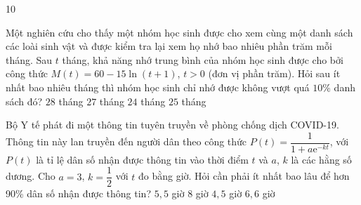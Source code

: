 \begin{indapan}{10}
\begin{ex}
	Một nghiên cứu cho thấy một nhóm học sinh được cho xem cùng một danh sách các loài sinh vật và được kiểm tra lại xem họ nhớ bao nhiêu phần trăm mỗi tháng. Sau $t$ tháng, khả năng nhớ trung bình của nhóm học sinh được cho bởi công thức $M(t)=60-15 \ln (t+1)$, $t>0$ (đơn vị phần trăm). Hỏi sau ít nhất bao nhiêu tháng thì nhóm học sinh chỉ nhớ được không vượt quá $10\%$ danh sách đó?
	\choice
	{\True $28$ tháng}
	{$27$ tháng}
	{$24$ tháng}
	{$25$ tháng}
\end{ex}
\begin{ex}
	Bộ Y tế phát đi một thông tin tuyên truyền về phòng chống dịch COVID-19. Thông tin này lan truyền đến người dân theo công thức $P(t)=\dfrac{1}{1+a\mathrm{e}^{-kt}}$, với $P(t)$ là tỉ lệ dân số nhận được thông tin vào thời điểm $t$ và $a$, $k$ là các hằng số dương. Cho $a=3$, $k=\dfrac{1}{2}$ với $t$ đo bằng giờ. Hỏi cần phải ít nhất bao lâu để hơn 90\% dân số nhận được thông tin?
	\choice
	{$5{,}5$ giờ}
	{$8$ giờ}
	{$4{,}5$ giờ}
	{\True $6{,}6$ giờ}
\end{ex}


\end{indapan}
